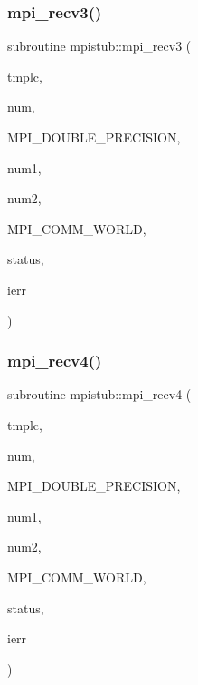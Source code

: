 \subsubsection{\texorpdfstring{mpi\_recv3()}{mpi\_recv3()}}
{\footnotesize\ttfamily subroutine mpistub\+::mpi\+\_\+recv3 (\begin{DoxyParamCaption}\item[{double precision, dimension(\+:)}]{tmplc,  }\item[{}]{num,  }\item[{}]{M\+P\+I\+\_\+\+D\+O\+U\+B\+L\+E\+\_\+\+P\+R\+E\+C\+I\+S\+I\+ON,  }\item[{}]{num1,  }\item[{}]{num2,  }\item[{}]{M\+P\+I\+\_\+\+C\+O\+M\+M\+\_\+\+W\+O\+R\+LD,  }\item[{integer, dimension(\+:)}]{status,  }\item[{}]{ierr }\end{DoxyParamCaption})}

\mbox{\label{namespacempistub_ab6b89c7d5ec60b643e3c939f926430c1}} 
\subsubsection{\texorpdfstring{mpi\_recv4()}{mpi\_recv4()}}
{\footnotesize\ttfamily subroutine mpistub\+::mpi\+\_\+recv4 (\begin{DoxyParamCaption}\item[{integer, dimension(\+:)}]{tmplc,  }\item[{}]{num,  }\item[{}]{M\+P\+I\+\_\+\+D\+O\+U\+B\+L\+E\+\_\+\+P\+R\+E\+C\+I\+S\+I\+ON,  }\item[{}]{num1,  }\item[{}]{num2,  }\item[{}]{M\+P\+I\+\_\+\+C\+O\+M\+M\+\_\+\+W\+O\+R\+LD,  }\item[{integer, dimension(\+:)}]{status,  }\item[{}]{ierr }\end{DoxyParamCaption})}

\mbox{\label{namespacempistub_a6ba478c1e620c237eb85776943b327ad}} 

